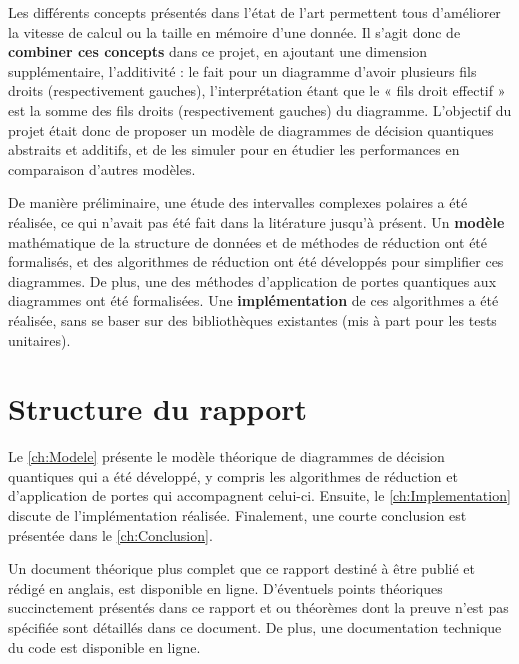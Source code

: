 Les différents concepts présentés dans l'état de l'art permettent tous d'améliorer la vitesse de calcul ou la taille en mémoire d'une donnée. Il s'agit donc de \textbf{combiner ces concepts} dans ce projet, en ajoutant une dimension supplémentaire, l'additivité : le fait pour un diagramme d'avoir plusieurs fils droits (respectivement gauches), l'interprétation étant que le « fils droit effectif » est la somme des fils droits (respectivement gauches) du diagramme.
L'objectif du projet était donc de proposer un modèle de diagrammes de décision quantiques abstraits et additifs, et de les simuler pour en étudier les performances en comparaison d'autres modèles.

De manière préliminaire, une étude des intervalles complexes polaires a été réalisée, ce qui n'avait pas été fait dans la litérature jusqu'à présent.
Un \textbf{modèle} mathématique de la structure de données et de méthodes de réduction ont été formalisés, et des algorithmes de réduction ont été développés pour simplifier ces diagrammes.
De plus, une des méthodes d'application de portes quantiques aux diagrammes ont été formalisées.
Une \textbf{implémentation} de ces algorithmes a été réalisée, sans se baser sur des bibliothèques existantes (mis à part pour les tests unitaires).

\section{Structure du rapport}
\label{sec:Structure}

Le \autoref{ch:Modele} présente le modèle théorique de diagrammes de décision quantiques qui a été développé, y compris les algorithmes de réduction et d'application de portes qui accompagnent celui-ci. Ensuite, le \autoref{ch:Implementation} discute de l'implémentation réalisée. Finalement, une courte conclusion est présentée dans le \autoref{ch:Conclusion}.

Un document théorique plus complet que ce rapport destiné à être publié et rédigé en anglais, est disponible en ligne. D'éventuels points théoriques succinctement présentés dans ce rapport et ou théorèmes dont la preuve n'est pas spécifiée sont détaillés dans ce document. \cite{Leroy_2025} De plus, une documentation technique du code est disponible en ligne. \cite{Leroy_doc}
